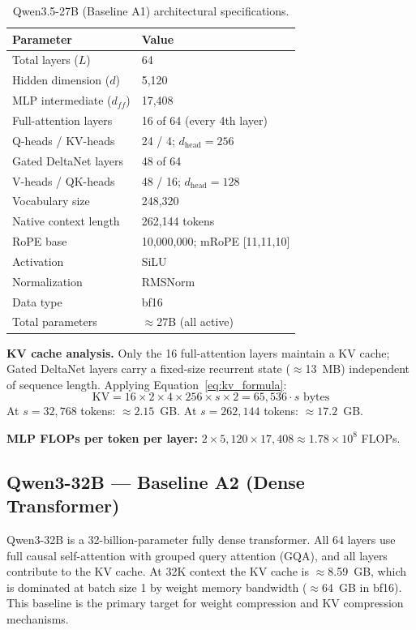 \documentclass[11pt]{article}
\begin{document}
\begin{table}[ht]
\centering
\caption{Qwen3.5-27B (Baseline A1) architectural specifications.}
\label{tab:a1_specs}
\begin{tabular}{ll}
\toprule
\textbf{Parameter} & \textbf{Value} \\
\midrule
Total layers ($L$) & 64 \\
Hidden dimension ($d$) & 5,120 \\
MLP intermediate ($d_{ff}$) & 17,408 \\
Full-attention layers & 16 of 64 (every 4th layer) \\
\quad Q-heads / KV-heads & 24 / 4; $d_{\text{head}} = 256$ \\
Gated DeltaNet layers & 48 of 64 \\
\quad V-heads / QK-heads & 48 / 16; $d_{\text{head}} = 128$ \\
Vocabulary size & 248,320 \\
Native context length & 262,144 tokens \\
RoPE base & 10,000,000; mRoPE [11,11,10] \\
Activation & SiLU \\
Normalization & RMSNorm \\
Data type & bf16 \\
Total parameters & $\approx$27B (all active) \\
\bottomrule
\end{tabular}
\end{table}

\textbf{KV cache analysis.}
Only the 16 full-attention layers maintain a KV cache; Gated DeltaNet layers carry a fixed-size recurrent state ($\approx$13~MB) independent of sequence length.
Applying Equation~\ref{eq:kv_formula}:
\[
\text{KV} = 16 \times 2 \times 4 \times 256 \times s \times 2 = 65{,}536 \cdot s \text{ bytes}
\]
At $s = 32{,}768$ tokens: $\approx 2.15$~GB. At $s = 262{,}144$ tokens: $\approx 17.2$~GB.

\textbf{MLP FLOPs per token per layer:}
$2 \times 5{,}120 \times 17{,}408 \approx 1.78 \times 10^{8}$ FLOPs.

\subsection{Qwen3-32B --- Baseline A2 (Dense Transformer)}
\label{sec:baseline_a2}

Qwen3-32B is a 32-billion-parameter fully dense transformer.
All 64 layers use full causal self-attention with grouped query attention (GQA), and all layers contribute to the KV cache.
At 32K context the KV cache is $\approx$8.59~GB, which is dominated at batch size 1 by weight memory bandwidth ($\approx$64~GB in bf16).
This baseline is the primary target for weight compression and KV compression mechanisms.
\end{document}
